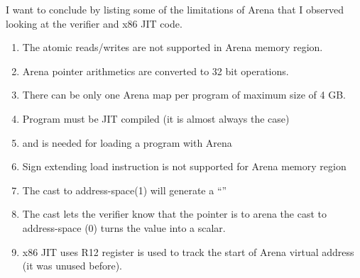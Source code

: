 \documentclass{article}
\begin{document}
I want to conclude by listing some of the limitations of Arena that I observed
looking at the verifier and x86 JIT code.

\begin{enumerate}
\item The atomic reads/writes are not supported in Arena memory region.
\item Arena pointer arithmetics are converted to 32 bit operations.
\item There can be only one Arena map per program of maximum size of 4 GB.
\item Program must be JIT compiled (it is almost always the case)
\item {} and  is needed for loading a program with Arena
\item Sign extending load instruction is not supported for Arena memory region
\item The cast to address-space(1) will generate a ``''
\item The cast lets the verifier know that the pointer is to arena
        the cast to address-space (0) turns the value into a scalar.
\item x86 JIT uses R12 register is used to track the start of Arena virtual
    address (it was unused before).
\end{enumerate}



\end{document}
